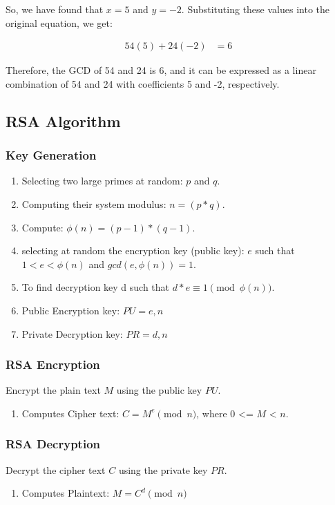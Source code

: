\documentclass[openany]{book}
\begin{document}
So, we have found that $x = 5$ and $y = -2$. Substituting these values into the original equation, we get:

\begin{align*}
	54(5) + 24(-2) & = 6 \
\end{align*}

Therefore, the GCD of 54 and 24 is 6, and it can be expressed as a linear combination of 54 and 24 with coefficients 5 and -2, respectively.

\subsection{RSA Algorithm}
\subsubsection{Key Generation}
\begin{enumerate}
	\item Selecting two large primes at random: $p$ and $q$.
	\item Computing their system modulus: $n = (p*q)$.
	\item Compute: $\phi(n) = (p-1)*(q-1)$.
	\item selecting at random the encryption key (public key): $e$ such that $1 < e < \phi(n)$ and $gcd(e, \phi(n)) = 1$.
	\item To find decryption key d such that $d*e \equiv 1 \pmod{\phi(n)}$.
	\item Public Encryption key: $PU = {e, n}$
	\item Private Decryption key: $PR = {d, n}$
\end{enumerate}
\subsubsection{RSA Encryption}
Encrypt the plain text $M$ using the public key $PU$.
\begin{enumerate}
	\item Computes Cipher text: $C = M^e \pmod{n}$, where 0 <= $M$ < $n$.
\end{enumerate}

\subsubsection{RSA Decryption}
Decrypt the cipher text $C$ using the private key $PR$.
\begin{enumerate}
	\item Computes Plaintext: $M = C^d \pmod{n}$
\end{enumerate}
\end{document}
